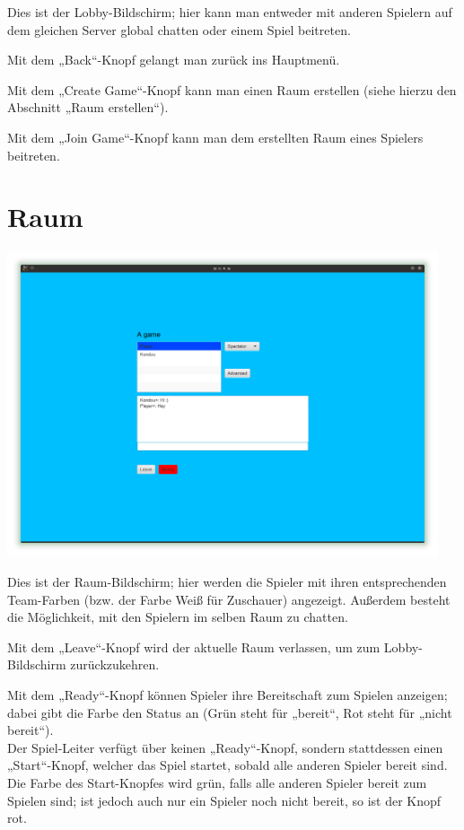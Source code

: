 \documentclass{scrreprt}
\begin{document}
Dies ist der Lobby-Bildschirm; hier kann man entweder mit anderen Spielern auf dem gleichen Server global chatten oder einem
Spiel beitreten.

Mit dem „Back“-Knopf gelangt man zurück ins Hauptmenü.

Mit dem „Create Game“-Knopf kann man einen Raum erstellen (siehe hierzu den Abschnitt „Raum erstellen“).

Mit dem „Join Game“-Knopf kann man dem erstellten Raum eines Spielers beitreten.

\section{Raum}

\includegraphics[height=9cm]{Screenshot10.png}

Dies ist der Raum-Bildschirm; hier werden die Spieler mit ihren entsprechenden Team-Farben (bzw. der Farbe Weiß für
Zuschauer) angezeigt. Außerdem besteht die Möglichkeit, mit den Spielern im selben Raum zu chatten.

Mit dem „Leave“-Knopf wird der aktuelle Raum verlassen, um zum Lobby-Bildschirm zurückzukehren.

Mit dem „Ready“-Knopf können Spieler ihre Bereitschaft zum Spielen anzeigen; dabei gibt die Farbe den Status an (Grün steht für „bereit“,
Rot steht für „nicht bereit“).\\
Der Spiel-Leiter verfügt über keinen „Ready“-Knopf, sondern stattdessen einen „Start“-Knopf, welcher das Spiel startet, sobald alle anderen Spieler bereit sind. Die Farbe des Start-Knopfes wird grün, falls alle anderen Spieler bereit zum Spielen sind; ist jedoch auch nur ein Spieler noch nicht bereit, so ist der Knopf rot.
\end{document}
